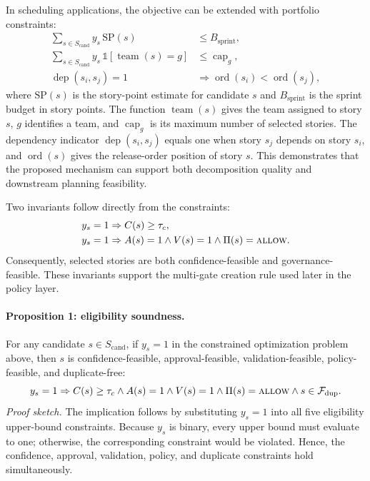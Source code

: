 \documentclass[pdflatex,sn-basic]{sn-jnl}
\begin{document}
In scheduling applications, the objective can be extended with portfolio constraints:
\begin{align}
\sum_{s \in S_{\text{cand}}} y_s\,\mathrm{SP}(s) &\leq B_{\text{sprint}}, \\
\sum_{s \in S_{\text{cand}}} y_s\,\mathbb{1}[\operatorname{team}(s)=g] &\leq \operatorname{cap}_g, \\
\operatorname{dep}(s_i,s_j)=1 &\Rightarrow \operatorname{ord}(s_i) < \operatorname{ord}(s_j),
\end{align}
where $\mathrm{SP}(s)$ is the story-point estimate for candidate $s$ and $B_{\text{sprint}}$ is the sprint budget in story points. The function $\operatorname{team}(s)$ gives the team assigned to story $s$, $g$ identifies a team, and $\operatorname{cap}_g$ is its maximum number of selected stories. The dependency indicator $\operatorname{dep}(s_i,s_j)$ equals one when story $s_j$ depends on story $s_i$, and $\operatorname{ord}(s)$ gives the release-order position of story $s$. This demonstrates that the proposed mechanism can support both decomposition quality and downstream planning feasibility.

Two invariants follow directly from the constraints:
\begin{align}
y_s=1 &\Rightarrow C(s)\ge\tau_c, \\
y_s=1 &\Rightarrow A(s)=1 \land V(s)=1 \land \Pi(s)=\textsc{allow}.
\end{align}
Consequently, selected stories are both confidence-feasible and governance-feasible. These invariants support the multi-gate creation rule used later in the policy layer.
\paragraph{Proposition 1: eligibility soundness.}
For any candidate $s\in S_{\text{cand}}$, if $y_s=1$ in the constrained optimization problem above, then $s$ is confidence-feasible, approval-feasible, validation-feasible, policy-feasible, and duplicate-free:
\begin{equation}
y_s=1 \Rightarrow
C(s)\ge\tau_c \land A(s)=1 \land V(s)=1 \land \Pi(s)=\textsc{allow} \land s\in\mathcal{F}_{\mathrm{dup}}.
\end{equation}
\textit{Proof sketch.}
The implication follows by substituting $y_s=1$ into all five eligibility upper-bound constraints. Because $y_s$ is binary, every upper bound must evaluate to one; otherwise, the corresponding constraint would be violated. Hence, the confidence, approval, validation, policy, and duplicate constraints hold simultaneously.
\end{document}
